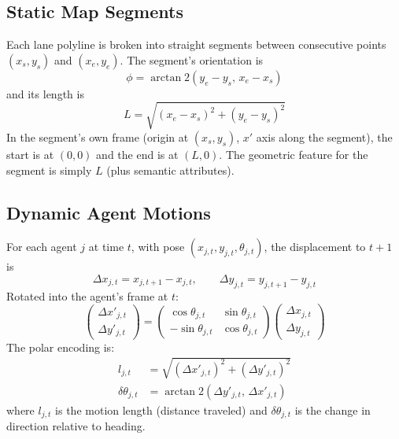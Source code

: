 \subsection{Static Map Segments}
Each lane polyline is broken into straight segments between consecutive points $(x_s, y_s)$ and $(x_e, y_e)$. The segment's orientation is
\begin{equation}
\phi = \arctan2(y_e - y_s,\, x_e - x_s)
\end{equation}
and its length is
\begin{equation}
L = \sqrt{(x_e - x_s)^2 + (y_e - y_s)^2}
\end{equation}
In the segment's own frame (origin at $(x_s, y_s)$, $x'$ axis along the segment), the start is at $(0,0)$ and the end is at $(L,0)$. The geometric feature for the segment is simply $L$ (plus semantic attributes).

\subsection{Dynamic Agent Motions}
For each agent $j$ at time $t$, with pose $(x_{j,t}, y_{j,t}, \theta_{j,t})$, the displacement to $t+1$ is
\begin{equation}
\Delta x_{j,t} = x_{j,t+1} - x_{j,t}, \qquad \Delta y_{j,t} = y_{j,t+1} - y_{j,t}
\end{equation}
Rotated into the agent's frame at $t$:
\begin{equation}
\begin{pmatrix}
    \Delta x'_{j,t} \\ \Delta y'_{j,t}
\end{pmatrix}
=
\begin{pmatrix}
    \cos\theta_{j,t} & \sin\theta_{j,t} \\
    -\sin\theta_{j,t} & \cos\theta_{j,t}
\end{pmatrix}
\begin{pmatrix}
    \Delta x_{j,t} \\ \Delta y_{j,t}
\end{pmatrix}
\end{equation}
The polar encoding is:
\begin{align}
l_{j,t} &= \sqrt{(\Delta x'_{j,t})^2 + (\Delta y'_{j,t})^2} \\
\delta\theta_{j,t} &= \arctan2(\Delta y'_{j,t},\, \Delta x'_{j,t})
\end{align}
where $l_{j,t}$ is the motion length (distance traveled) and $\delta\theta_{j,t}$ is the change in direction relative to heading.

